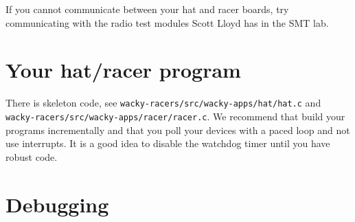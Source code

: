 If you cannot communicate between your hat and racer boards, try
communicating with the radio test modules Scott Lloyd has in the SMT
lab.

\section{Your hat/racer program}
\label{your-hatracer-program}

There is skeleton code, see
\texttt{wacky-racers/src/wacky-apps/hat/hat.c} and
\texttt{wacky-racers/src/wacky-apps/racer/racer.c}. We recommend that
build your programs incrementally and that you poll your devices with a
paced loop and not use interrupts. It is a good idea to disable the
watchdog timer until you have robust code.

\begin{Shaded}
\begin{Highlighting}[]


\NormalTok{)}
\NormalTok{\{}

    

    \NormalTok{ (}\NormalTok{)}
\NormalTok{    \{}


        
\NormalTok{    \}}
    
     \NormalTok{;}
\NormalTok{\}}
\end{Highlighting}
\end{Shaded}

\section{Debugging}
\label{debugging}

